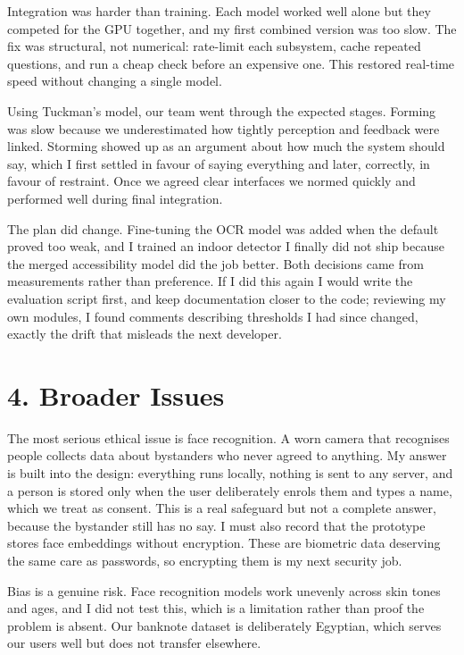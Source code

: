 \documentclass[12pt,a4paper]{report}
\begin{document}
Integration was harder than training. Each model worked well alone but they
competed for the GPU together, and my first combined version was too slow. The
fix was structural, not numerical: rate-limit each subsystem, cache repeated
questions, and run a cheap check before an expensive one. This restored real-time
speed without changing a single model.

Using Tuckman's model, our team went through the expected stages. Forming was
slow because we underestimated how tightly perception and feedback were linked.
Storming showed up as an argument about how much the system should say, which I
first settled in favour of saying everything and later, correctly, in favour of
restraint. Once we agreed clear interfaces we normed quickly and performed well
during final integration.

The plan did change. Fine-tuning the OCR model was added when the default proved
too weak, and I trained an indoor detector I finally did not ship because the
merged accessibility model did the job better. Both decisions came from
measurements rather than preference. If I did this again I would write the
evaluation script first, and keep documentation closer to the code; reviewing my
own modules, I found comments describing thresholds I had since changed, exactly
the drift that misleads the next developer.

\section*{4. Broader Issues}

The most serious ethical issue is face recognition. A worn camera that
recognises people collects data about bystanders who never agreed to anything. My
answer is built into the design: everything runs locally, nothing is sent to any
server, and a person is stored only when the user deliberately enrols them and
types a name, which we treat as consent. This is a real safeguard but not a
complete answer, because the bystander still has no say. I must also record that
the prototype stores face embeddings without encryption. These are biometric data
deserving the same care as passwords, so encrypting them is my next security job.

Bias is a genuine risk. Face recognition models work unevenly across skin tones
and ages, and I did not test this, which is a limitation rather than proof the
problem is absent. Our banknote dataset is deliberately Egyptian, which serves
our users well but does not transfer elsewhere.
\end{document}
